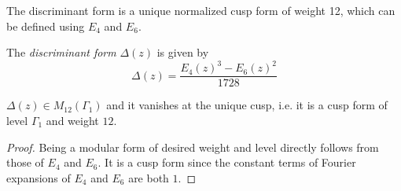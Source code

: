 The discriminant form is a unique normalized cusp form of weight 12, which can be defined using $E_4$ and $E_6$.
\begin{definition}\label{def-disc-definition}%
The \emph{discriminant form} $\Delta(z)$ is given by
\begin{equation}\label{eqn-disc-definition}
\Delta(z) = \frac{E_4(z)^3 - E_6(z)^2}{1728}
\end{equation}
\end{definition}

\begin{lemma}\label{lem-disc-cuspform}
$\Delta(z) \in M_{12}(\Gamma_1)$ and it vanishes at the unique cusp, i.e. it is a cusp form of level $\Gamma_1$ and weight $12$.
\end{lemma}
\begin{proof}
Being a modular form of desired weight and level directly follows from those of $E_4$ and $E_6$.
It is a cusp form since the constant terms of Fourier expansions of $E_4$ and $E_6$ are both $1$.
\end{proof}

